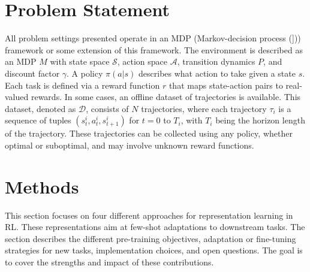 \documentclass{article}
\begin{document}
\section{Problem Statement}

All problem settings presented operate in an MDP (Markov-decision process (\cite{bellman1958dynamic}])) framework or some extension of this framework. The environment is described as an MDP $M$ with state space $\mathcal{S}$, action space $\mathcal{A}$, transition dynamics $P$, and discount factor $\gamma$. A policy $\pi(a|s)$ describes what action to take given a state $s$. Each task is defined via a reward function $r$ that maps state-action pairs to real-valued rewards. In some cases, an offline dataset of trajectories is available. This dataset, denoted as $\mathcal{D}$, consists of $N$ trajectories, where each trajectory $\tau_i$ is a sequence of tuples $(s_t^i, a_t^i, s_{t+1}^i)$ for $t = 0$ to $T_i$, with $T_i$ being the horizon length of the trajectory. These trajectories can be collected using any policy, whether optimal or suboptimal, and may involve unknown reward functions.


\section{Methods}

This section focuses on four different approaches for representation learning in RL. These representations aim at few-shot adaptations to downstream tasks. The section describes the different pre-training objectives, adaptation or fine-tuning strategies for new tasks, implementation choices, and open questions. The goal is to cover the strengths and impact of these contributions.
\end{document}
